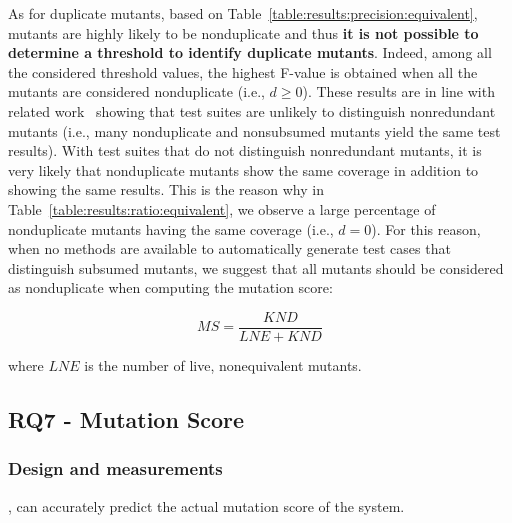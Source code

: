 As for duplicate mutants, based on Table~\ref{table:results:precision:equivalent},
mutants are highly likely to be nonduplicate and thus \textbf{it is not possible to determine a threshold to identify duplicate mutants}. Indeed, among all the considered threshold values, the highest F-value is obtained when all the mutants are considered nonduplicate (i.e., $d\ge0$). These results are in line with related work~\cite{shin2017theoretical} showing that test suites are unlikely to distinguish nonredundant mutants (i.e., many nonduplicate and nonsubsumed mutants yield the same test results).
With test suites that do not distinguish nonredundant mutants, it is very likely that nonduplicate mutants show the same coverage in addition to showing the same results. This is the reason why in Table~\ref{table:results:ratio:equivalent}, we observe a large percentage of nonduplicate mutants having the same coverage (i.e., $d=0$). For this reason, when no methods are available to automatically generate test cases that distinguish subsumed mutants, we suggest that all mutants should be considered as nonduplicate when computing the mutation score:

\begin{equation}
\label{equation:ms:exp}
\mathit{MS} = \frac{\mathit{KND}}{\mathit{LNE}+\mathit{KND}}
\end{equation}

where $\mathit{LNE}$ is the number of live, nonequivalent mutants.







\subsection{RQ7 - \APPR Mutation Score}

\subsubsection{Design and measurements}

,
can accurately predict
the actual mutation score of the system.

